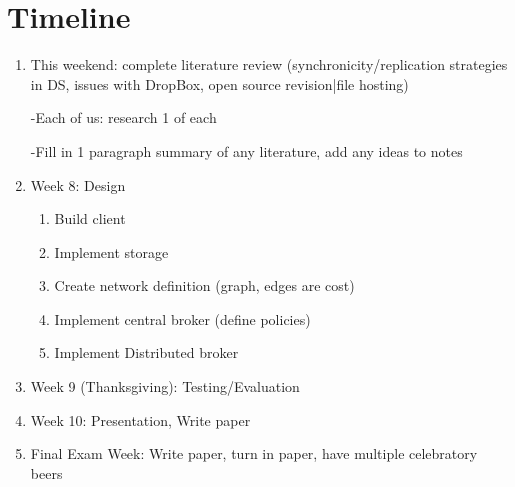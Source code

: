 \section{Timeline}
\begin{enumerate}
\item This weekend: complete literature review (synchronicity/replication strategies in DS, issues with DropBox, open source revision|file hosting)

-Each of us: research 1 of each

-Fill in 1 paragraph summary of any literature, add any ideas to notes

\item Week 8: Design
  \begin{enumerate}
    \item Build client
    \item Implement storage
    \item Create network definition (graph, edges are cost)
    \item Implement central broker (define policies)
    \item Implement Distributed broker
  \end{enumerate}
\item Week 9 (Thanksgiving): Testing/Evaluation
\item Week 10: Presentation, Write paper
\item Final Exam Week: Write paper, turn in paper, have multiple celebratory beers
\end{enumerate}
